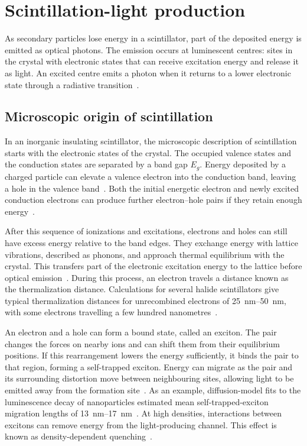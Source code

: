 \section{Scintillation-light production}

As secondary particles lose energy in a scintillator, part of the deposited energy is emitted as optical photons. The emission occurs at luminescent centres: sites in the crystal with electronic states that can receive excitation energy and release it as light. An excited centre emits a photon when it returns to a lower electronic state through a radiative transition~\parencite{pedrini2005scintillation}.

\subsection{Microscopic origin of scintillation}

In an inorganic insulating scintillator, the microscopic description of scintillation starts with the electronic states of the crystal. The occupied valence states and the conduction states are separated by a band gap $E_g$. Energy deposited by a charged particle can elevate a valence electron into the conduction band, leaving a hole in the valence band~\parencite{pedrini2005scintillation}. Both the initial energetic electron and newly excited conduction electrons can produce further electron--hole pairs if they retain enough energy~\parencites[pp.~38, 44]{shockley1961junctions}.

After this sequence of ionizations and excitations, electrons and holes can still have excess energy relative to the band edges. They exchange energy with lattice vibrations, described as phonons, and approach thermal equilibrium with the crystal. This transfers part of the electronic excitation energy to the lattice before optical emission~\parencite{pedrini2005scintillation}. During this process, an electron travels a distance known as the thermalization distance. Calculations for several halide scintillators give typical thermalization distances for unrecombined electrons of \qtyrange{25}{50}{\nano\metre}, with some electrons travelling a few hundred nanometres~\parencite{wang2012thermalization}.

An electron and a hole can form a bound state, called an exciton. The pair changes the forces on nearby ions and can shift them from their equilibrium positions. If this rearrangement lowers the energy sufficiently, it binds the pair to that region, forming a self-trapped exciton. Energy can migrate as the pair and its surrounding distortion move between neighbouring sites, allowing light to be emitted away from the formation site~\parencite{prange2013excitations}. As an example, diffusion-model fits to the luminescence decay of  nanoparticles estimated mean self-trapped-exciton migration lengths of \qtyrange{13}{17}{\nano\metre}~\parencite{chylii2018diffusion}. At high densities, interactions between excitons can remove energy from the light-producing channel. This effect is known as density-dependent quenching~\parencite{prange2013excitations}.

